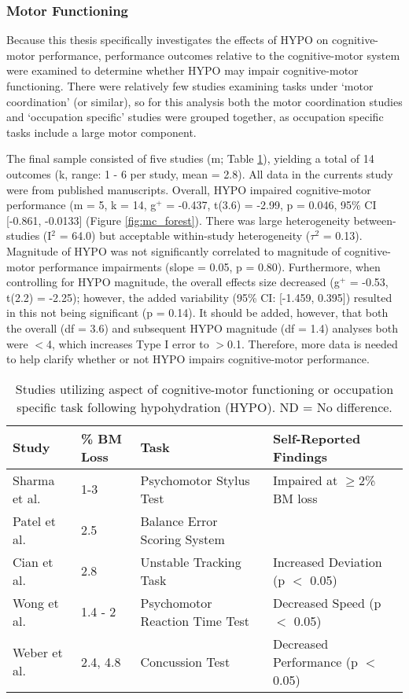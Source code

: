 \subsubsection{Motor Functioning}
Because this thesis specifically investigates the effects of HYPO on cognitive-motor performance, performance outcomes relative to the cognitive-motor system were examined to determine whether HYPO may impair cognitive-motor functioning. There were relatively few studies examining tasks under `motor coordination' (or similar), so for this analysis both the motor coordination studies and `occupation specific' studies were grouped together, as occupation specific tasks include a large motor component.

The final sample consisted of five studies (m; Table \ref{tbl:m_c_studies}), yielding a total of 14 outcomes (k, range: 1 - 6 per study, mean = 2.8). All data in the currents study were from published manuscripts. Overall, HYPO impaired cognitive-motor performance (m = 5, k = 14, g${^+}$ = -0.437, t(3.6) = -2.99, p = 0.046, 95\% CI [-0.861, -0.0133] (Figure \ref{fig:mc_forest}). There was large heterogeneity between-studies (I${^2}$ = 64.0) but acceptable within-study heterogeneity (${\tau}$${^2}$ = 0.13). Magnitude of HYPO was not significantly correlated to magnitude of cognitive-motor performance impairments (slope = 0.05, p = 0.80). Furthermore, when controlling for HYPO magnitude, the overall effects size decreased (g${^+}$ = -0.53, t(2.2) = -2.25); however, the added variability (95\% CI: [-1.459, 0.395]) resulted in this not being significant (p = 0.14). It should be added, however, that both the overall (df = 3.6) and subsequent HYPO magnitude (df = 1.4) analyses both were ${<}$4, which increases Type I error to ${>}$0.1. Therefore, more data is needed to help clarify whether or not HYPO impairs cognitive-motor performance.   

\begin{table}
	\caption{Studies utilizing aspect of cognitive-motor functioning or occupation specific task following hypohydration (HYPO). ND = No difference.}
	\centering
	\begin{tabular}{llll} 
		\hline
		\textbf{Study} & \textbf{\% BM Loss} & \textbf{Task} & \textbf{Self-Reported Findings} \\
		\hline
		Sharma et al. \cite{sharma_influence_1986} & 1-3 & Psychomotor Stylus Test & Impaired at ${\ge}$2\% BM loss \\
		Patel et al. \cite{patel_neuropsychological_2007} & 2.5 & Balance Error Scoring System & \textemdash \\
		Cian et al. \cite{cian_influence_2000} & 2.8 & Unstable Tracking Task & Increased Deviation (p ${<}$ 0.05) \\
		Wong et al. \cite{wong_effects_2014} & 1.4 - 2 & Psychomotor Reaction Time Test & Decreased Speed (p ${<}$ 0.05) \\
		Weber et al. \cite{weber_dehydration_2013} & 2.4, 4.8 & Concussion Test & Decreased Performance (p ${<}$ 0.05) \\
		\hline		    
	\end{tabular}
	\label{tbl:m_c_studies}
\end{table}


